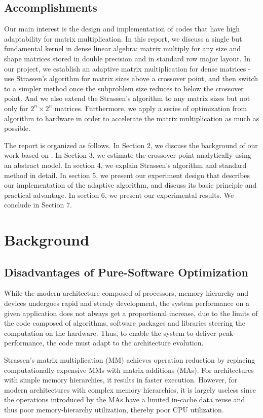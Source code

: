 \documentclass[UTF8]{ctexart}
\begin{document}
\subsection{Accomplishments}
\label{subsec::Accom}
Our main interest is the design and implementation of codes that have high adaptability for matrix multiplication. In this report, we discuss a single but fundamental kernel in dense linear algebra: matrix multiply for any size and shape matrices stored in double precision and in standard row major layout. In our project,  we establish an adaptive matrix multiplication for dense matrices - use Strassen’s algorithm for matrix sizes above a crossover point, and then switch to a simpler method once the subproblem size reduces to below the crossover point. And we also extend the Strassen's algorithm to any matrix sizes but not only for $2^n\times 2^n$ matrices. Furthermore, we apply a series of optimization from algorithm to hardware in order to accelerate the matrix multiplication as much as possible.

The report is organized as follows. In Section 2, we discuss the background of our work based on \cite{10.1145/1274971.1275010}. In Section 3, we estimate the crossover point analytically using an abstract model.  In section 4, we explain Strassen's algorithm and standard method in detail. In section 5, we present our experiment design that describes our implementation of the adaptive algorithm, and discuss its basic principle and practical advantage. In section 6, we present our experimental results. We conclude in Section 7.
\section{Background}
\label{sec::bgnd}

\subsection{Disadvantages of Pure-Software Optimization}
\label{subsec::DoPutOp}
While the modern architecture composed of processors, memory hierarchy and devices undergoes rapid and steady development, the system performance on a given application does not always get a proportional increase, due to the limits of the code composed of algorithms, software packages and libraries steering the computation on the hardware. Thus, to enable the system to deliver peak performance, the code must adapt to the architecture evolution.

Strassen's matrix multiplication (MM) achieves operation reduction by replacing computationally expensive MMs with matrix additions (MAs). For architectures with simple memory hierarchies, it results in faster execution. However, for modern architectures with complex memory hierarchies, it is largely useless since the operations introduced by the MAs have a limited in-cache data reuse and thus poor memory-hierarchy utilization, thereby poor CPU utilization.
\end{document}
